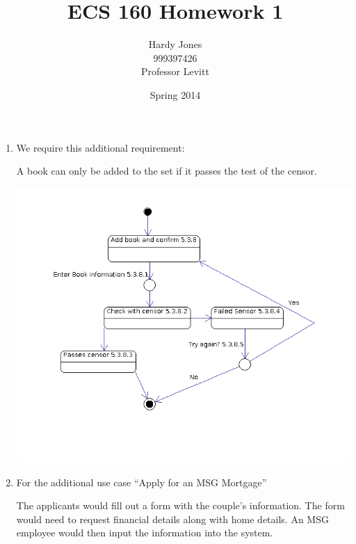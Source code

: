 \documentclass[12pt,letterpaper]{article}
\title{ECS 160 Homework 1 \vspace{-2ex}}
\author{Hardy Jones\\
        999397426\\
        Professor Levitt\vspace{-2ex}}
\date{Spring 2014}
\begin{document}
  \maketitle

  \begin{enumerate}
    \item We require this additional requirement:

      A book can only be added to the set if it passes the test of the censor.

      \includegraphics[width=\textwidth]{hw1_part1.png}

    \item For the additional use case ``Apply for an MSG Mortgage''

      The applicants would fill out a form with the couple's information.
      The form would need to request financial details along with home details.
      An MSG employee would then input the information into the system.


\end{enumerate}
\end{document}

